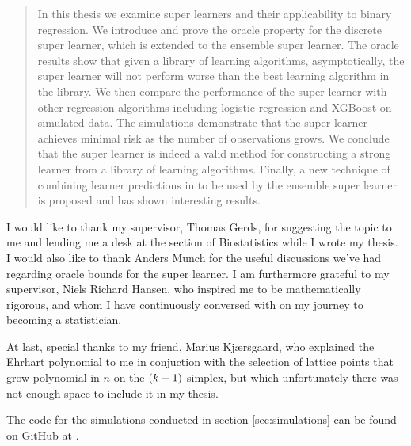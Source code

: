 \vspace{\fill}
\begin{abstract}
In this thesis we examine super learners and their applicability to binary regression. We introduce and prove the oracle property for the discrete super learner, which is extended to the ensemble super learner. The oracle results show that given a library of learning algorithms, asymptotically, the super learner will not perform worse than the best learning algorithm in the library. We then compare the performance of the super learner with other regression algorithms including logistic regression and XGBoost on simulated data. The simulations demonstrate that the super learner achieves minimal risk as the number of observations grows. We conclude that the super learner is indeed a valid method for constructing a strong learner from a library of learning algorithms. Finally, a new technique of combining learner predictions in to be used by the ensemble super learner is proposed and has shown interesting results. 
\end{abstract}
\vspace{\fill}
\begin{acknowledgements}
   I would like to thank my supervisor, Thomas Gerds, for suggesting the topic to me and lending me a desk at the section of Biostatistics while I wrote my thesis. I would also like to thank Anders Munch for the useful discussions we've had regarding oracle bounds for the super learner. I am furthermore grateful to my supervisor, Niels Richard Hansen, who inspired me to be mathematically rigorous, and whom I have continuously conversed with on my journey to becoming a statistician.

   At last, special thanks to my friend, Marius Kjærsgaard, who explained the Ehrhart polynomial to me in conjuction with the selection of lattice points that grow polynomial in $ n $ on the $ (k-1) $-simplex, but which unfortunately there was not enough space to include it in my thesis. 
\end{acknowledgements}
\vspace{\fill}
\begin{codeavailability}
    The code for the simulations conducted in section \ref{sec:simulations} can be found on GitHub at \parencite{github}.
\end{codeavailability}
\vspace{\fill}

